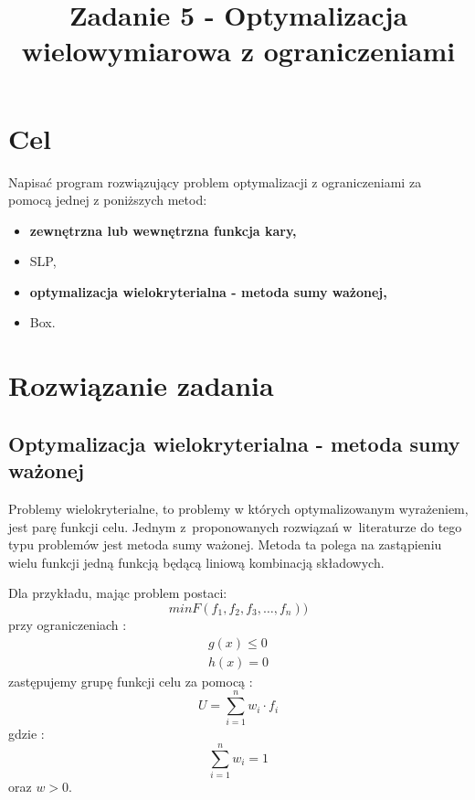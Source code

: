 \documentclass{classrep}
\author{
  \studentinfo{Paweł Musiał}{178726} \and
  \studentinfo{Łukasz Michalski}{178724}
}
\title{Zadanie 5 - Optymalizacja wielowymiarowa z ograniczeniami}
\begin{document}
\maketitle

\section{Cel}

Napisać program rozwiązujący problem optymalizacji z ograniczeniami za pomocą jednej z poniższych metod:
\begin{itemize}
\item \textbf{zewnętrzna lub wewnętrzna funkcja kary,}
\item SLP,
\item \textbf{optymalizacja wielokryterialna - metoda sumy ważonej,}
\item Box.
\end{itemize}


\section{Rozwiązanie zadania}

\subsection{Optymalizacja wielokryterialna - metoda sumy ważonej}

Problemy wielokryterialne, to problemy w których optymalizowanym wyrażeniem, jest parę funkcji celu. Jednym z~proponowanych rozwiązań w~literaturze \cite{2} do tego typu problemów jest metoda sumy ważonej. Metoda ta polega na zastąpieniu wielu funkcji jedną funkcją będącą liniową kombinacją składowych.

\noindent Dla przykładu, mając problem postaci:
\begin{equation}
min F(f_1, f_2, f_3, \dots, f_n))
\end{equation}
\noindent przy ograniczeniach :
\begin{align}
g(x) \leq 0 \nonumber\\
h(x) = 0 \nonumber
\end{align}
zastępujemy grupę funkcji celu za pomocą :
\begin{equation}
U = \sum \limits ^{n} _{i=1} w_i \cdot f_i
\end{equation}
\noindent gdzie : 
\begin{equation*}
\sum \limits ^{n} _{i=1} w_i = 1
\end{equation*}
oraz $w>0$.
\end{document}
